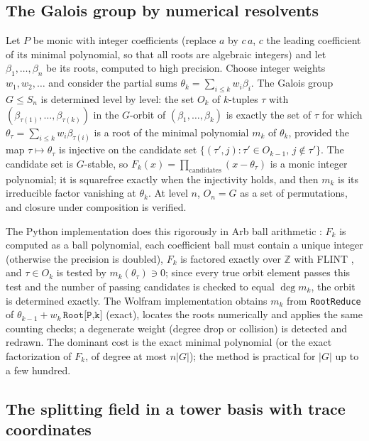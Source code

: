 \documentclass[11pt,a4paper]{article}
\theoremstyle{definition}
\theoremstyle{remark}
\newcommand{\Z}{\mathbb{Z}}
\newcommand{\code}[1]{\texttt{#1}}
\begin{document}
\subsection{The Galois group by numerical resolvents}

Let $P$ be monic with integer coefficients (replace $a$ by $c\,a$, $c$ the leading coefficient of its
minimal polynomial, so that all roots are algebraic integers) and let $\beta_1,\dots,\beta_n$ be its
roots, computed to high precision.  Choose integer weights $w_1,w_2,\dots$ and consider the partial
sums $\theta_k=\sum_{i\le k}w_i\beta_i$.  The Galois group $G\le S_n$ is determined level by level: the
set $O_k$ of $k$-tuples $\tau$ with $(\beta_{\tau(1)},\dots,\beta_{\tau(k)})$ in the $G$-orbit of
$(\beta_1,\dots,\beta_k)$ is exactly the set of $\tau$ for which $\theta_\tau=\sum_{i\le k}
w_i\beta_{\tau(i)}$ is a root of the minimal polynomial $m_k$ of $\theta_k$, provided the map
$\tau\mapsto\theta_\tau$ is injective on the candidate set $\{(\tau',j):\tau'\in O_{k-1},\,j\notin\tau'\}$.
The candidate set is $G$-stable, so $F_k(x)=\prod_{\text{candidates}}(x-\theta_\tau)$ is a monic integer
polynomial; it is squarefree exactly when the injectivity holds, and then $m_k$ is its irreducible
factor vanishing at $\theta_k$.  At level $n$, $O_n=G$ as a set of permutations, and closure under
composition is verified.

The Python implementation does this rigorously in Arb ball arithmetic \cite{Arb}: $F_k$ is computed
as a ball polynomial, each coefficient ball must contain a unique integer (otherwise the precision is
doubled), $F_k$ is factored exactly over $\Z$ with FLINT \cite{FLINT}, and $\tau\in O_k$ is tested by
$m_k(\theta_\tau)\ni0$; since every true orbit element passes this test and the number of passing
candidates is checked to equal $\deg m_k$, the orbit is determined exactly.  The Wolfram implementation
obtains $m_k$ from \code{RootReduce} of $\theta_{k-1}+w_k\,\code{Root[P,k]}$ (exact), locates the roots
numerically and applies the same counting checks; a degenerate weight (degree drop or collision) is
detected and redrawn.  The dominant cost is the exact minimal polynomial (or the exact factorization
of $F_k$, of degree at most $n|G|$); the method is practical for $|G|$ up to a few hundred.

\subsection{The splitting field in a tower basis with trace coordinates}
\end{document}

